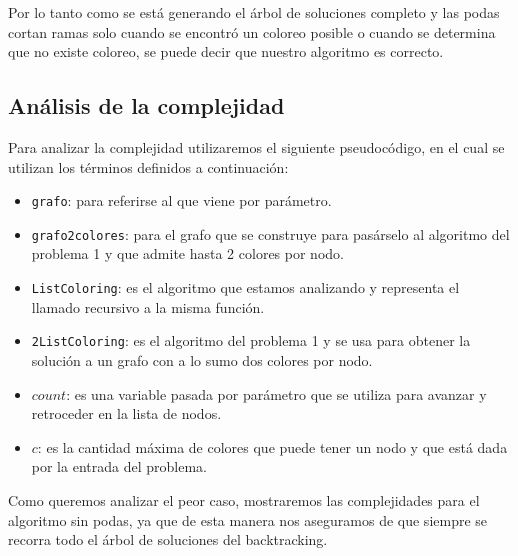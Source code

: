 Por lo tanto como se está generando el árbol de soluciones completo y las podas cortan ramas solo cuando se encontró un coloreo posible o cuando se determina que no existe coloreo, se puede decir que nuestro algoritmo es correcto.

\subsection{Análisis de la complejidad}
\label{sec:complj}

Para analizar la complejidad utilizaremos el siguiente pseudocódigo, en el cual se utilizan los términos definidos a continuación:
\begin{itemize}
	\item \texttt{grafo}: para referirse al que viene por parámetro.

	\item \texttt{grafo2colores}: para el grafo que se construye para pasárselo al algoritmo del problema 1 y que admite hasta 2 colores por nodo.

	\item \texttt{ListColoring}: es el algoritmo que estamos analizando y representa el llamado recursivo a la misma función.

	\item \texttt{2ListColoring}: es el algoritmo del problema 1 y se usa para obtener la solución a un grafo con a lo sumo dos colores por nodo.

	\item $count$: es una variable pasada por parámetro que se utiliza para avanzar y retroceder en la lista de nodos.

	\item $c$: es la cantidad máxima de colores que puede tener un nodo y que está dada por la entrada del problema.
\end{itemize}

Como queremos analizar el peor caso, mostraremos las complejidades para el algoritmo sin podas, ya que de esta manera nos aseguramos de que siempre se recorra todo el árbol de soluciones del backtracking.
\newline

